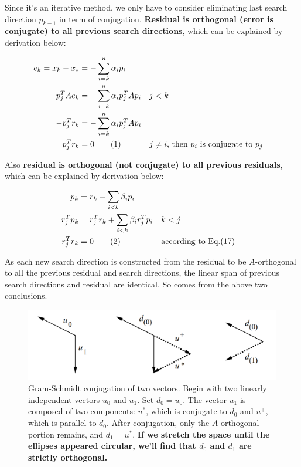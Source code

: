 \documentclass{article}
\newcommand\numberthis{\addtocounter{equation}{1}\tag{\theequation}}
\begin{document}
 Since it's an iterative method, we only have to consider eliminating last search direction $p_{k-1}$ in term of conjugation. \textbf{Residual is orthogonal (error is conjugate) to all previous search directions}, which can be explained by derivation below:
 
 \begin{align*}
     e_k=x_k-x_*&=-\sum^n_{i=k}\alpha_ip_i\\
     p^T_jAe_k&=-\sum^n_{i=k}\alpha_ip_j^TAp_i &&\text{$j<k$}\\
     -p_j^Tr_k&=-\sum^n_{i=k}\alpha_ip_j^TAp_i\\
     p_j^Tr_k&=0\numberthis &&\text{$j\not=i$, then $p_i$ is conjugate to $p_j$}
 \end{align*}
 
 Also \textbf{residual is orthogonal (not conjugate) to all previous residuals}, which can be explained by derivation below:
 
 \begin{align*}
     p_k&=r_k+\sum_{i<k}\beta_ip_i\\
     r_j^Tp_k&=r_j^Tr_k+\sum_{i<k}\beta_ir_j^Tp_i &&\text{$k<j$}\\
     r_j^Tr_k&=0\numberthis &&\text{according to Eq.(17)}
 \end{align*}
 
 As each new search direction is constructed from the residual to be $A$-orthogonal to all the previous residual and search directions, the linear span of previous search directions and residual are identical. So comes from the above two conclusions.

\begin{figure}[H]
    \centering
    \includegraphics[scale=0.3]{figure/Gram-Schmidt_conjuga}
    \caption{Gram-Schmidt conjugation of two vectors. Begin with two linearly independent vectors $u_0$ and
$u_1$. Set $d_0=u_0$. The vector $u_1$ is composed of two components: $u^*$, which is conjugate to $d_0$ and $u^+$, which is parallel to $d_0$. After conjugation, only the $A$-orthogonal portion remains, and $d_1=u^*$. \textbf{If we stretch the space until the ellipses appeared circular, we'll find that $d_0$ and $d_1$ are strictly orthogonal.}}
    \label{fig:gram}
\end{figure}
\end{document}
